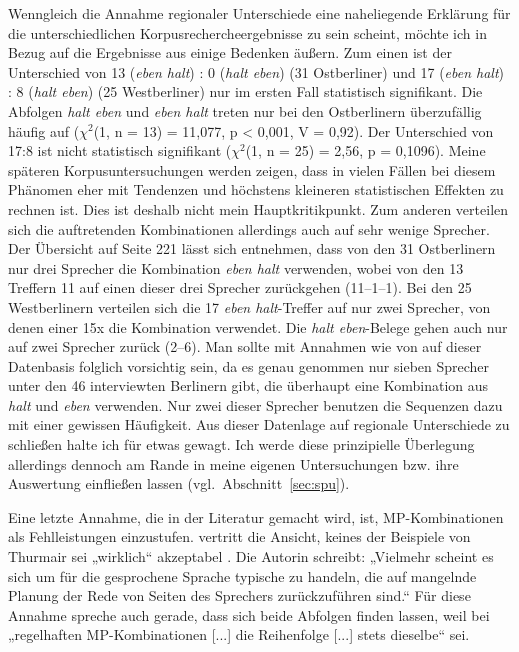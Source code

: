 Wenngleich die Annahme regionaler Unterschiede eine naheliegende Erklärung für die unterschiedlichen Korpusrechercheergebnisse zu sein scheint, möchte ich in Bezug auf die Ergebnisse aus \citet{Dittmar2000} einige Bedenken äußern. Zum einen ist der Unterschied von 13 (\textit{eben halt}) : 0 (\textit{halt eben}) (31 Ostberliner) und 17 (\textit{eben halt}) : 8 (\textit{halt eben}) (25 Westberliner) nur im ersten Fall statistisch signifikant. Die Abfolgen \textit{halt eben} und \textit{eben halt} treten nur bei den Ostberlinern überzufällig häufig auf ($\chi^{2}$(1, n = 13) = 11,077, p < 0,001, V = 0,92). Der Unterschied von 17:8 ist nicht statistisch signifikant ($\chi^{2}$(1, n = 25) = 2,56, p = 0,1096). Meine späteren Korpusuntersuchungen werden zeigen, dass in vielen Fällen bei diesem Phänomen eher mit Tendenzen und höchstens kleineren statistischen Effekten zu rechnen ist. Dies ist deshalb nicht mein Hauptkritikpunkt. Zum anderen verteilen sich die auftretenden Kombinationen allerdings auch auf sehr wenige Sprecher. Der Übersicht auf Seite 221 lässt sich entnehmen, dass von den 31 Ost\-berlinern nur drei Sprecher die Kombination \textit{eben halt} verwenden, wobei von den 13 Treffern 11 auf einen dieser drei Sprecher zurückgehen (11–1–1). Bei den 25 Westberlinern verteilen sich die 17 \textit{eben halt}-Treffer auf nur zwei Sprecher, von denen einer 15x die Kombination verwendet. Die \textit{halt eben}-Belege gehen auch nur auf zwei Sprecher zurück (2–6). Man sollte mit Annahmen wie von \citet{Elspass2005} auf dieser Datenbasis folglich vorsichtig sein, da es genau genommen nur sieben Sprecher unter den 46 interviewten Berlinern gibt, die überhaupt eine Kombination aus \textit{halt} und \textit{eben} verwenden. Nur zwei dieser Sprecher benutzen die Sequenzen dazu mit einer gewissen Häufigkeit. Aus dieser Datenlage auf regionale Unterschiede zu schließen halte ich für etwas gewagt. Ich werde diese prinzipielle Überlegung allerdings dennoch am Rande in meine eigenen Untersuchungen bzw. ihre Auswertung einfließen lassen (vgl.\ Abschnitt~\ref{sec:spu}).

Eine letzte Annahme, die in der Literatur gemacht wird, ist, MP-Kom\-bi\-na\-ti\-on\-en als Fehlleistungen einzustufen. \citet[96]{Autenrieth2002} vertritt die Ansicht, keines der Beispiele von Thurmair sei „wirklich“ akzeptabel . Die Autorin schreibt: „Vielmehr scheint es sich um für die gesprochene Sprache typische  zu handeln, die auf mangelnde Planung der Rede von Seiten des Sprechers zurückzuführen sind.“ Für diese Annahme spreche auch gerade, dass sich beide Abfolgen finden lassen, weil bei „regelhaften MP-Kom\-bi\-na\-ti\-on\-en [...] die Reihenfolge [...] stets dieselbe“ sei.

